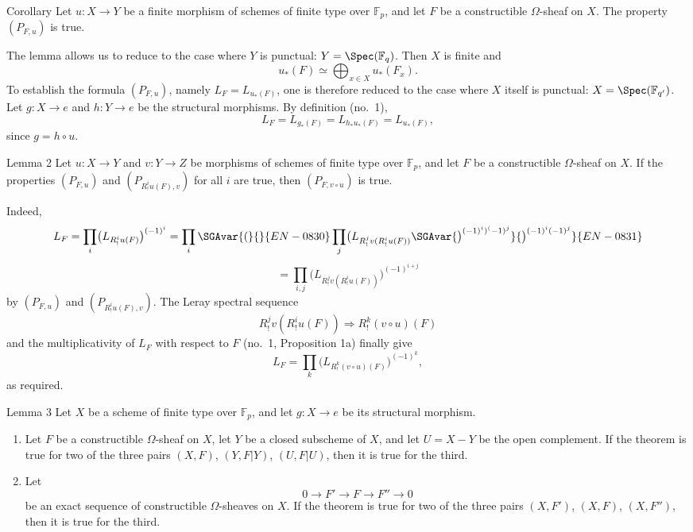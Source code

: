 \begin{statement}{Corollary}
Let $u:X\to Y$ be a finite morphism of schemes of finite type over $\mathbb F_p$, and let $F$ be a constructible $\Omega$-sheaf on $X$. The property $(P_{F,u})$ is true.
\end{statement}

The lemma allows us to reduce to the case where $Y$ is punctual: $Y=\Spec(\mathbb F_q)$. Then $X$ is finite and
\[
u_*(F)\simeq \bigoplus_{x\in X}u_*(F_x).
\]
To establish the formula $(P_{F,u})$, namely $L_F=L_{u_*(F)}$, one is therefore reduced to the case where $X$ itself is punctual: $X=\Spec(\mathbb F_{q'})$. Let $g:X\to e$ and $h:Y\to e$ be the structural morphisms. By definition (no.~1),
\[
L_F=L_{g_*(F)}=L_{h_*u_*(F)}=L_{u_*(F)},
\]
since $g=h\circ u$.

\begin{statement}{Lemma 2}
Let $u:X\to Y$ and $v:Y\to Z$ be morphisms of schemes of finite type over $\mathbb F_p$, and let $F$ be a constructible $\Omega$-sheaf on $X$. If the properties $(P_{F,u})$ and $(P_{R^i_!u(F),v})$ for all $i$ are true, then $(P_{F,v\circ u})$ is true.
\end{statement}

Indeed,
\[
L_F=\prod_i\bigl(L_{R^i_!u(F)}\bigr)^{(-1)^i}
 =\prod_i\SGAvar{(}{}{EN-0830}\prod_j\bigl(L_{R^j_!v(R^i_!u(F))}\SGAvar{\bigr)^{(-1)^i)^(-1)^j}}{\bigr)^{(-1)^i(-1)^j}}{EN-0831}
\]
\[
=\prod_{i,j}\bigl(L_{R^j_!v(R^i_!u(F))}\bigr)^{(-1)^{i+j}}
\]
by $(P_{F,u})$ and $(P_{R^i_!u(F),v})$. The Leray spectral sequence
\[
R^j_!v(R^i_!u(F))\Longrightarrow R^k_!(v\circ u)(F)
\]
and the multiplicativity of $L_F$ with respect to $F$ (no.~1, Proposition 1a) finally give
\[
L_F=\prod_k\bigl(L_{R^k_!(v\circ u)(F)}\bigr)^{(-1)^k},
\]
as required.

\begin{statement}{Lemma 3}
Let $X$ be a scheme of finite type over $\mathbb F_p$, and let $g:X\to e$ be its structural morphism.
\begin{enumerate}[label=\alph*)]
\item Let $F$ be a constructible $\Omega$-sheaf on $X$, let $Y$ be a closed subscheme of $X$, and let $U=X-Y$ be the open complement. If the theorem is true for two of the three pairs $(X,F)$, $(Y,F|Y)$, $(U,F|U)$, then it is true for the third.
\item Let
\[
0\longrightarrow F'\longrightarrow F\longrightarrow F''\longrightarrow0
\]
be an exact sequence of constructible $\Omega$-sheaves on $X$. If the theorem is true for two of the three pairs $(X,F')$, $(X,F)$, $(X,F'')$, then it is true for the third.
\end{enumerate}
\end{statement}

